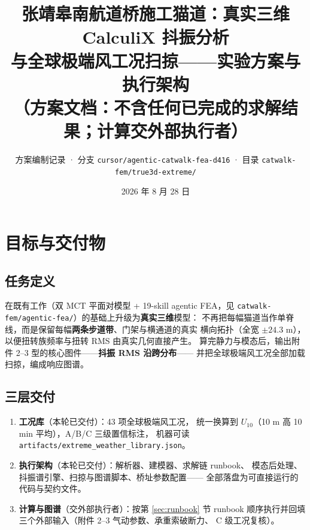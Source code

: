 \documentclass[11pt,a4paper]{ctexart}
\title{\bfseries 张靖皋南航道桥施工猫道：真实三维 CalculiX 抖振分析\\
与全球极端风工况扫掠——实验方案与执行架构\\
\large （方案文档：不含任何已完成的求解结果；计算交外部执行者）}
\author{方案编制记录 · 分支 \texttt{cursor/agentic-catwalk-fea-d416} · 目录 \texttt{catwalk-fem/true3d-extreme/}}
\date{2026 年 8 月 28 日}
\begin{document}
\maketitle

\noindent{}

\tableofcontents

\section{目标与交付物}

\subsection{任务定义}

在既有工作（双 MCT 平面对模型 + 19-skill agentic FEA，见
\texttt{catwalk-fem/agentic-fea/}）的基础上升级为\textbf{真实三维}模型：
不再把每幅猫道当作单脊线，而是保留每幅\textbf{两条步道带}、门架与横通道的真实
横向拓扑（全宽 $\pm 24.3$ m），以便扭转族频率与扭转 RMS 由真实几何直接产生。
算完静力与模态后，输出附件 2--3 型的核心图件——\textbf{抖振 RMS 沿跨分布}——
并把全球极端风工况全部加载扫掠，编成响应图谱。

\subsection{三层交付}

\begin{enumerate}
  \item \textbf{工况库}（本轮已交付）：43 项全球极端风工况，
        统一换算到 $U_{10}$（10 m 高 10 min 平均），A/B/C 三级置信标注，
        机器可读 \texttt{artifacts/extreme\_weather\_library.json}。
  \item \textbf{执行架构}（本轮已交付）：解析器、建模器、求解链 runbook、
        模态后处理、抖振谱引擎、扫掠与图谱脚本、桥址参数配置——
        全部落盘为可直接运行的代码与契约文件。
  \item \textbf{计算与图谱}（交外部执行者）：按第 \ref{sec:runbook} 节 runbook
        顺序执行并回填三个外部输入（附件 2--3 气动参数、承重索破断力、
        C 级工况复核）。
\end{enumerate}
\end{document}
